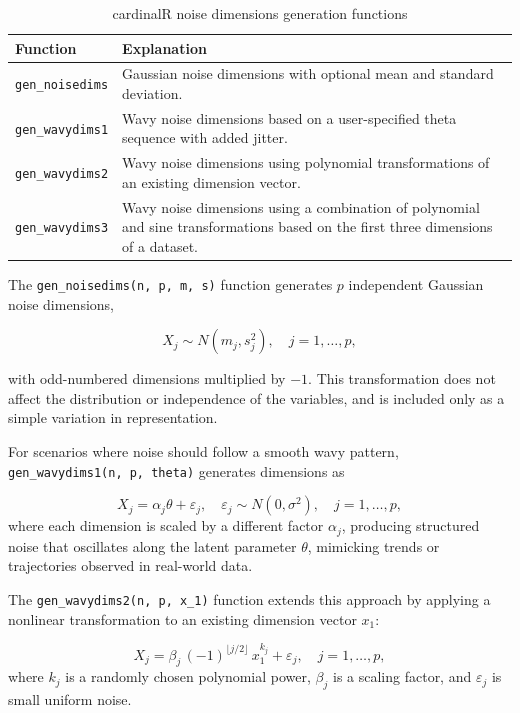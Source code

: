 \begin{table}

\caption{\label{tab:noise-tb-pdf}cardinalR noise dimensions generation functions}
\centering
\begin{tabular}[t]{>{\raggedright\arraybackslash}p{2.5cm}>{\raggedright\arraybackslash}p{10.5cm}}
\toprule
Function & Explanation\\
\midrule
\texttt{gen\_noisedims} & Gaussian noise dimensions with optional mean and standard deviation.\\
\texttt{gen\_wavydims1} & Wavy noise dimensions based on a user-specified theta sequence with added jitter.\\
\texttt{gen\_wavydims2} & Wavy noise dimensions using polynomial transformations of an existing dimension vector.\\
\texttt{gen\_wavydims3} & Wavy noise dimensions using a combination of polynomial and sine transformations based on the first three dimensions of a dataset.\\
\bottomrule
\end{tabular}
\end{table}

The \texttt{gen\_noisedims(n,\ p,\ m,\ s)} function generates \(p\) independent Gaussian noise dimensions,

\[
X_j \sim N(m_j, s_j^2), \quad j = 1, \dots, p,
\]

with odd-numbered dimensions multiplied by \(-1\). This transformation does not affect the distribution or independence of the variables, and is included only as a simple variation in representation.

For scenarios where noise should follow a smooth wavy pattern, \texttt{gen\_wavydims1(n,\ p,\ theta)} generates dimensions as

\[
X_j = \alpha_j \theta + \varepsilon_j, \quad \varepsilon_j \sim N(0, \sigma^2), \quad j = 1, \dots, p,
\]where each dimension is scaled by a different factor \(\alpha_j\), producing structured noise that oscillates along the latent parameter \(\theta\), mimicking trends or trajectories observed in real-world data.

The \texttt{gen\_wavydims2(n,\ p,\ x\_1)} function extends this approach by applying a nonlinear transformation to an existing dimension vector \(x_1\):

\[
X_j = \beta_j \, (-1)^{\lfloor j/2 \rfloor} \, x_1^{k_j} + \varepsilon_j, \quad j = 1, \dots, p,
\]where \(k_j\) is a randomly chosen polynomial power, \(\beta_j\) is a scaling factor, and \(\varepsilon_j\) is small uniform noise.

